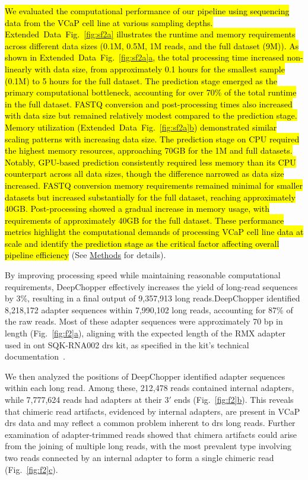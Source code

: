\documentclass[pdflatex,sn-nature, lineno]{sn-jnl}%
\newcommand{\figref}[2]{Fig.~\hyperref[#1]{\ref*{#1}#2}}
\newcommand{\edfigref}[2]{Extended Data Fig.~\hyperref[#1]{\ref*{#1}#2}}
\begin{document}
\hl{We evaluated the computational performance of our pipeline using sequencing data from the VCaP cell line at various sampling depths.
	\mbox{\edfigref{fig:sf2a}{}} illustrates the runtime and memory requirements across different data sizes (0.1M, 0.5M, 1M reads, and the full dataset (9M)).
	As shown in \mbox{\edfigref{fig:sf2a}{a}}, the total processing time increased non-linearly with data size, from approximately 0.1 hours for the smallest sample (0.1M) to 5 hours for the full dataset.
	The prediction stage emerged as the primary computational bottleneck, accounting for over 70\% of the total runtime in the full dataset.
	FASTQ conversion and post-processing times also increased with data size but remained relatively modest compared to the prediction stage.
	Memory utilization (\mbox{\edfigref{fig:sf2a}{b}}) demonstrated similar scaling patterns with increasing data size.
	The prediction stage on CPU required the highest memory resources, approaching 70GB for the 1M and full datasets.
	Notably, GPU-based prediction consistently required less memory than its CPU counterpart across all data sizes, though the difference narrowed as data size increased.
	FASTQ conversion memory requirements remained minimal for smaller datasets but increased substantially for the full dataset, reaching approximately 40GB.
	Post-processing showed a gradual increase in memory usage, with requirements of approximately 40GB for the full dataset.
	These performance metrics highlight the computational demands of processing VCaP cell line data at scale and identify the prediction stage as the critical factor affecting overall pipeline efficiency} (See \hyperref[sec:methods]{Methods} for details).

By improving processing speed while maintaining reasonable computational requirements, DeepChopper effectively increases the yield of long-read sequences by 3\%, resulting in a final output of 9,357,913 long reads.DeepChopper identified 8,218,172 adapter sequences within 7,990,102 long reads, accounting for 87\% of the raw reads.
Most of these adapter sequences were approximately 70 bp in length (\figref{fig:f2}{a}), aligning with the expected length of the RMX adapter used in \gls{ont} SQK-RNA002 \gls{drs} kit, as specified in the kit's technical documentation~\cite{nano2017tech}.

We then analyzed the positions of DeepChopper identified adapter sequences within each long read.
Among these, 212,478 reads contained internal adapters, while 7,777,624 reads had adapters at their $3'$ ends (\figref{fig:f2}{b}).
This reveals that chimeric read artifacts, evidenced by internal adapters, are present in VCaP \gls{drs} data and may reflect a common problem inherent to \gls{drs} long reads.
Further examination of adapter-trimmed reads showed that chimera artifacts could arise from the joining of multiple long reads, with the most prevalent type involving two reads connected by an internal adapter to form a single chimeric read (\figref{fig:f2}{c}).
\end{document}
